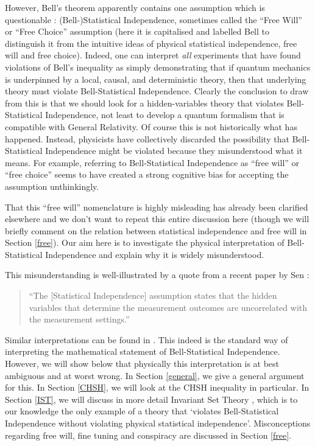 \documentclass[12pt]{article}
\begin{document}
However, Bell's theorem  apparently contains one assumption which is questionable : (Bell-)Statistical Independence, sometimes called the ``Free Will'' or ``Free Choice'' assumption (here it is capitalised and labelled Bell to distinguish it from the intuitive ideas of physical statistical independence, free will and free  choice).
Indeed, one can interpret \emph{all} experiments that have found violations of Bell's inequality as simply demonstrating that if quantum mechanics is underpinned by a local, causal, and deterministic theory, then that underlying theory must violate Bell-Statistical Independence. Clearly the conclusion to draw from this is that we should look for a hidden-variables theory that violates Bell-Statistical Independence, not least to develop a quantum formalism that is compatible with General Relativity. 
Of course this is not historically what has happened. Instead, physicists have collectively discarded the possibility that Bell-Statistical Independence might be violated because they misunderstood what it means. For example, referring to Bell-Statistical Independence as ``free will'' or ``free choice'' seems to have created a strong cognitive bias for accepting the assumption unthinkingly. 

That this ``free will'' nomenclature is highly misleading has already been clarified elsewhere \cite{Hossenfelder2020Rethinking,Hossenfelder2020SuperdeterminismGuide} and we don't want to repeat this entire discussion here (though we will briefly comment on the relation between statistical independence and free will in Section \ref{free}). Our aim here is to investigate the physical interpretation of Bell-Statistical Independence and explain why it is widely misunderstood. 

This misunderstanding is well-illustrated by a quote from a recent paper by Sen \cite{sen2022analysis}:
\begin{quote}
``The [Statistical Independence] assumption states that the hidden variables that determine the measurement outcomes are uncorrelated with the measurement settings.''
\end{quote}
Similar interpretations can be found in \cite{Sen2020Superdet1,Sen2020Superdet2}. This indeed is the standard way of interpreting the mathematical statement of Bell-Statistical Independence. However, we will show below that physically this interpretation is at best ambiguous and at worst wrong. In Section \ref{general}, we give a general argument for this. In Section \ref{CHSH}, we will look at the {\sc CHSH} inequality in particular. In Section \ref{IST}, we will discuss in more detail Invariant Set Theory \cite{Palmer2020Discretization}, which is to our knowledge the only example of a theory that `violates Bell-Statistical Independence without violating physical statistical independence'. Misconceptions regarding free will, fine tuning and conspiracy are discussed in Section \ref{free}.
\end{document}
